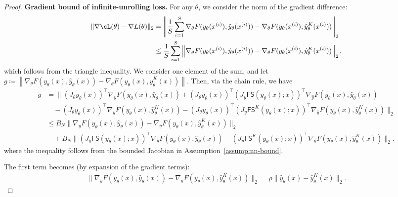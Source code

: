 \documentclass{article}
\def\FS{\mathsf{FS}}
\def\x{x}
\def\y{y_{\theta}}   \def\hy{\hat{y}_{\theta}}    \def\ty{\Tilde{y}}
\def\i{{(i)}}
\begin{document}
\begin{proof}
    \vspace{12pt}
    \textbf{Gradient bound of infinite-unrolling loss.  }
    For any $\theta$, we consider the norm of the gradient difference:
    \begin{align}
        \|\nabla \cL(\theta) -  \nabla L(\theta) \|_2 &= \left\| \frac{1}{S} \sum_{i=1}^S \nabla_\theta F(\y(\x^\i), \hy(\x^\i)) -  \nabla_\theta F(\y(\x^\i), \hy^K(\x^\i)) \right\|_2 \nonumber\\
        &\leq \frac{1}{S} \sum_{i=1}^S \left\| \nabla_\theta F(\y(\x^\i), \hy(\x^\i)) -  \nabla_\theta F(\y(\x^\i), \hy^K(\x^\i)) \right\|_2, \label{eq: grad difference}
    \end{align}
    which follows from the triangle inequality. We consider one element of the sum, and let $g \coloneqq \left\| \nabla_\theta F(\y(\x), \hy(\x)) -  \nabla_\theta F(\y(\x), \hy^K(\x)) \right\|$. Then, via the chain rule, we have 
\begin{align*}
    g &= \big\| (J_\theta \y(\x))^\top \nabla_y F(\y(\x), \hy(\x)) + (J_\theta \y(\x))^\top (J_y \FS(\y(\x); \x))^\top \nabla_{\hat{y}} F(\y(\x), \hy(\x)) \\
    &\quad - (J_\theta \y(\x))^\top \nabla_y F(\y(\x), \hy^K(\x)) - (J_\theta \y(\x))^\top (J_y \FS^K(\y(\x);\x))^\top \nabla_{\hat{y}} F(\y(\x), \hy^K(\x)) \big\|_2 \\
    &\leq B_N \big\|\nabla_y F(\y(\x), \hy(\x)) - \nabla_y F(\y(\x), \hy^K(\x)) \big\|_2 \\
    &\quad + B_N \big\| (J_y \FS(\y(\x); \x))^\top \nabla_{\hat{y}} F(\y(\x), \hy(\x)) -  (J_y \FS^K(\y(\x);\x))^\top \nabla_{\hat{y}} F(\y(\x), \hy^K(\x)) \big\|_2.
\end{align*}
where the inequality follows from the bounded Jacobian in Assumption~\ref{assump:nn-bound}.

The first term becomes (by expansion of the gradient terms):
\begin{align*}
    \big\|\nabla_y F(\y(\x), \hy(\x)) - \nabla_y F(\y(\x), \hy^K(\x)) \big\|_2 = \rho \big\| \hy(\x) - \hy^K(\x) \big\|_2.
\end{align*}


\end{proof}
\end{document}
